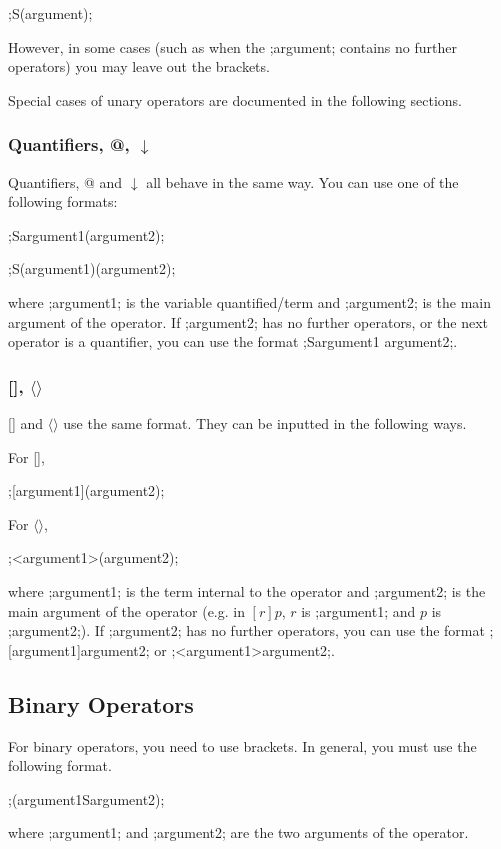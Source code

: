\documentclass[a4paper]{article}
\begin{document}
\begin{center}
;S(argument);
\end{center}

However, in some cases (such as when the ;argument; contains no further operators) you may leave out the brackets.

Special cases of unary operators are documented in the following sections.

\subsubsection{Quantifiers, @, $\downarrow$}
Quantifiers, @ and $\downarrow$ all behave in the same way. You can use one of the following formats:
\begin{center}
;Sargument1(argument2);
\end{center}

\begin{center}
;S(argument1)(argument2);
\end{center}
where ;argument1; is the variable quantified/term and ;argument2; is the main argument of the operator. If ;argument2; has no further operators, or the next operator is a quantifier, you can use the format ;Sargument1 argument2;.
\subsubsection{[], $\langle \rangle$}
[] and $\langle \rangle$ use the same format. They can be inputted in the following ways.

For [],
\begin{center}
;[argument1](argument2);
\end{center}

For $\langle \rangle$,
\begin{center}
;<argument1>(argument2);
\end{center}
where ;argument1; is the term internal to the operator and ;argument2; is the main argument of the operator (e.g. in $[r]p$, $r$ is ;argument1; and $p$ is ;argument2;). If ;argument2; has no further operators, you can use the format ;[argument1]argument2; or ;<argument1>argument2;.

\subsection{Binary Operators}
For binary operators, you need to use brackets. In general, you must use the following format.

\begin{center}
;(argument1Sargument2);
\end{center}
where ;argument1; and ;argument2; are the two arguments of the operator. 
\end{document}
